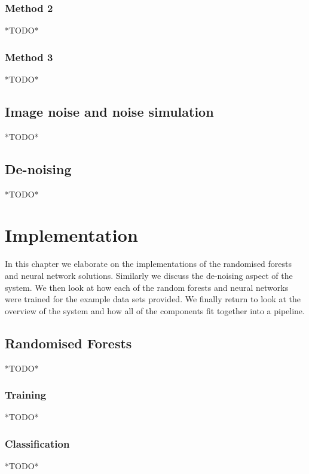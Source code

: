\documentclass[12pt,twoside,notitlepage]{report}
\begin{document}
        \subsection{Method 2}
            *TODO*

        \subsection{Method 3}
            *TODO*



    \section{Image noise and noise simulation}
    *TODO*



    \section{De-noising}
    *TODO*








\cleardoublepage
\chapter{Implementation}
    In this chapter we elaborate on the implementations of the randomised forests and neural network solutions. 
    Similarly we discuss the de-noising aspect of the system. We then look at how each of the random forests and neural 
    networks were trained for the example data sets provided. We finally return to look at the overview of the system 
    and how all of the components fit together into a pipeline.

    \section{Randomised Forests}
    *TODO*

      \subsection{Training}
      *TODO*

      \subsection{Classification}
      *TODO*
\end{document}
